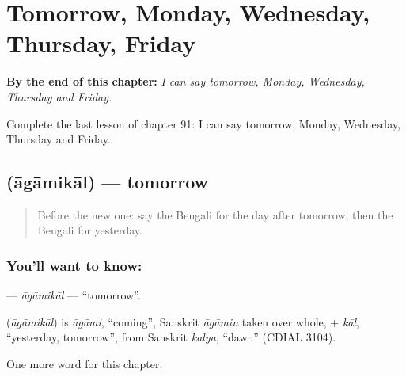 
\chapter{Tomorrow, Monday, Wednesday, Thursday, Friday}
\label{ch:bn-tomorrow-monday-wednesday-thursday-friday}

\begin{chapteropening}
\textbf{By the end of this chapter:} \emph{I can say tomorrow, Monday, Wednesday, Thursday and Friday.}

Complete the last lesson of chapter 91: I can say tomorrow, Monday, Wednesday, Thursday and Friday.
\end{chapteropening}

\section[\texorpdfstring{\bn{আগামীকাল} (āgāmikāl)}{আগামীকাল (āgāmikāl)}]{ (āgāmikāl) — tomorrow}

\label{lesson:BN-C91-agamikal}



\begin{quote}
Before the new one: say the Bengali for the day after tomorrow, then the Bengali for yesterday.
\end{quote}

\subsection*{You'll want to know: }
\textbf{} — \emph{āgāmikāl} — \textquotedblleft{}tomorrow\textquotedblright{}.

\begin{cousinweb}
\textbf{} (\emph{āgāmikāl}) is \emph{āgāmi}, \textquotedblleft{}coming\textquotedblright{}, Sanskrit \emph{āgāmin} taken over whole, + \emph{kāl}, \textquotedblleft{}yesterday, tomorrow\textquotedblright{}, from Sanskrit \emph{kalya}, \textquotedblleft{}dawn\textquotedblright{} (CDIAL 3104).
\end{cousinweb}

\begin{grammarlens}[title={What you've built}]
One more word for this chapter.
\end{grammarlens}

